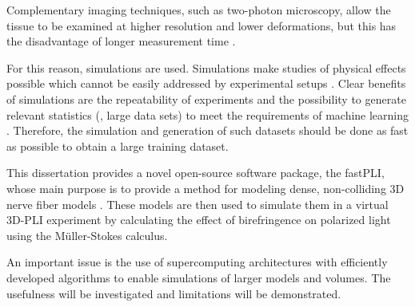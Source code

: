Complementary imaging techniques, such as two-photon microscopy, allow the tissue to be examined at higher resolution and lower deformations, but this has the disadvantage of longer measurement time \cite{Costantini2020, Costantini2021}.
\par
% 
For this reason, simulations are used.
Simulations make studies of physical effects possible which cannot be easily addressed by experimental setups \cite{Callaghan2019, Menzel2020}.
Clear benefits of simulations are the repeatability of experiments and the possibility to generate relevant statistics (\ie{}, large data sets) to meet \eg{} the requirements of machine learning \cite{Ginsburger2018, ginsburgerDis2019}.
Therefore, the simulation and generation of such datasets should be done as fast as possible to obtain a large training dataset.
\par
%
This dissertation provides a novel open-source software package, the \ac{fastPLI}, whose main purpose is to provide a method for modeling dense, non-colliding 3D nerve fiber models \cite{Matuschke2019, Matuschke2021, Reuter2019}.
These models are then used to simulate them in a virtual \ac{3D-PLI} experiment by calculating the effect of birefringence on polarized light using the M{\"u}ller-Stokes calculus.
\par
% 
An important issue is the use of supercomputing architectures with efficiently developed algorithms to enable simulations of larger models and volumes.
The usefulness will be investigated and limitations will be demonstrated.
